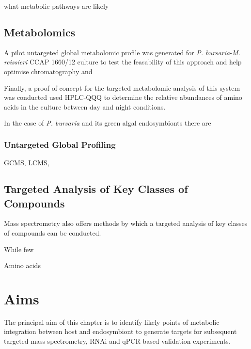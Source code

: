 what metabolic pathways are likely










\subsection{Metabolomics}


A pilot untargeted global metabolomic profile was generated
for \textit{P. bursaria}-\textit{M. reissieri} CCAP 1660/12 
culture to test the feasability of this approach and help optimise
chromatography and 

Finally, a proof of concept for the targeted metabolomic
analysis of this system was conducted used HPLC-QQQ
to determine the relative abundances of amino acids
in the culture between day and night conditions. 

In the case of \textit{P. bursaria} and its green algal endosymbionts 
there are



\subsubsection{Untargeted Global Profiling}
GCMS, LCMS,

\subsection{Targeted Analysis of Key Classes of Compounds}

Mass spectrometry also offers methods by which a targeted 
analysis of key classes of compounds can be conducted. 


While few

Amino acids 



\section{Aims}

The principal aim of this chapter is to identify
likely points of metabolic integration between host and 
endosymbiont to generate targets for subsequent 
targeted mass spectrometry, RNAi and qPCR based validation
experiments. 

